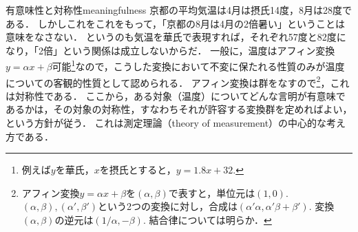 \documentclass[11pt,a4paper]{jsarticle}
\begin{document}
 

\begin{rei}{有意味性と対称性}{meaningfulness}
京都の平均気温は4月は摂氏14度，8月は28度である．
しかしこれをこれをもって，「京都の8月は4月の2倍暑い」ということは意味をなさない．
というのも気温を華氏で表現すれば，それぞれ57度と82度になり，「2倍」という関係は成立しないからだ．
一般に，温度はアフィン変換$y = \alpha x + \beta$可能\footnote{例えば$y$を華氏，$x$を摂氏とすると，$y = 1.8x+32$.}なので，こうした変換において不変に保たれる性質のみが温度についての客観的性質として認められる．
アフィン変換は群をなすので\footnote{アフィン変換$y=\alpha x + \beta$を$(\alpha, \beta)$で表すと，単位元は$(1,0)$. $(\alpha, \beta), (\alpha',\beta')$という2つの変換に対し，合成は$(\alpha' \alpha, \alpha' \beta + \beta')$. 変換$(\alpha, \beta)$の逆元は$(1/\alpha, -\beta)$. 結合律については明らか．}，これは対称性である．
ここから，ある対象（温度）についてどんな言明が有意味であるかは，その対象の対称性，すなわちそれが許容する変換群を定めればよい，という方針が従う．
これは測定理論（theory of measurement）の中心的な考え方である\citep[e.g,][]{Narens2007-ty}．
\end{rei}
\end{document}
